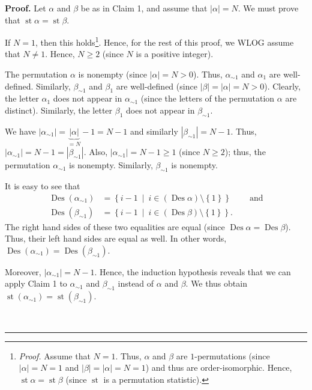 \documentclass[numbers=enddot,12pt,final,onecolumn,notitlepage]{scrartcl}%
\theoremstyle{definition}
\newenvironment{proof}[1][Proof]{\noindent\textbf{#1.} }{\ \rule{0.5em}{0.5em}}
\newenvironment{verlong}{}{}
\begin{document}
\begin{verlong}
\begin{proof}
Let $\alpha$ and $\beta$ be as in Claim 1, and assume that $\left\vert
\alpha\right\vert =N$. We must prove that
$\operatorname{st} \alpha = \operatorname{st} \beta$.

If $N=1$, then this holds\footnote{\textit{Proof.} Assume that $N=1$. Thus,
$\alpha$ and $\beta$ are $1$-permutations (since $\left\vert \alpha\right\vert
=N=1$ and $\left\vert \beta\right\vert =\left\vert \alpha\right\vert =N=1$)
and thus are order-isomorphic. Hence,
$\operatorname{st} \alpha =\operatorname{st} \beta$ (since
$\operatorname{st}$ is a permutation statistic).}. Hence, for the rest of
this proof, we WLOG assume that $N\neq1$. Hence, $N\geq2$ (since $N$ is a
positive integer).

The permutation $\alpha$ is nonempty (since $\left\vert \alpha\right\vert
=N>0$). Thus, $\alpha_{\sim1}$ and $\alpha_{1}$ are well-defined. Similarly,
$\beta_{\sim1}$ and $\beta_{1}$ are well-defined (since $\left\vert
\beta\right\vert =\left\vert \alpha\right\vert =N>0$). Clearly, the letter
$\alpha_{1}$ does not appear in $\alpha_{\sim1}$ (since the letters of the
permutation $\alpha$ are distinct). Similarly, the letter $\beta_{1}$ does not
appear in $\beta_{\sim1}$.

We have $\left\vert \alpha_{\sim1}\right\vert =\underbrace{\left\vert
\alpha\right\vert }_{=N}-1=N-1$ and similarly $\left\vert \beta_{\sim
1}\right\vert =N-1$. Thus, $\left\vert \alpha_{\sim1}\right\vert
=N-1=\left\vert \beta_{\sim1}\right\vert $. Also, $\left\vert \alpha_{\sim
1}\right\vert =N-1\geq1$ (since $N\geq2$); thus, the permutation $\alpha
_{\sim1}$ is nonempty. Similarly, $\beta_{\sim1}$ is nonempty.

It is easy to see that
\begin{align*}
\operatorname{Des}\left(  \alpha_{\sim1}\right)   &  =\left\{  i-1\ \mid
\ i\in\left(  \operatorname{Des}\alpha\right)  \setminus\left\{  1\right\}
\right\}  \ \ \ \ \ \ \ \ \ \ \text{and}\\
\operatorname{Des}\left(  \beta_{\sim1}\right)   &  =\left\{  i-1\ \mid
\ i\in\left(  \operatorname{Des}\beta\right)  \setminus\left\{  1\right\}
\right\}  .
\end{align*}
The right hand sides of these two equalities are equal (since
$\operatorname{Des}\alpha=\operatorname{Des}\beta$). Thus, their left hand
sides are equal as well. In other words, $\operatorname{Des}\left(
\alpha_{\sim1}\right)  =\operatorname{Des}\left(  \beta_{\sim1}\right)  $.

Moreover, $\left\vert \alpha_{\sim1}\right\vert =N-1$.
Hence, the induction hypothesis reveals that
we can apply Claim 1 to $\alpha_{\sim1}$ and $\beta_{\sim1}$ instead of
$\alpha$ and $\beta$. We thus obtain $\operatorname{st}\left(  \alpha_{\sim
1}\right)  =\operatorname{st}\left(  \beta_{\sim1}\right)  $.


\end{proof}
\end{verlong}
\end{document}
